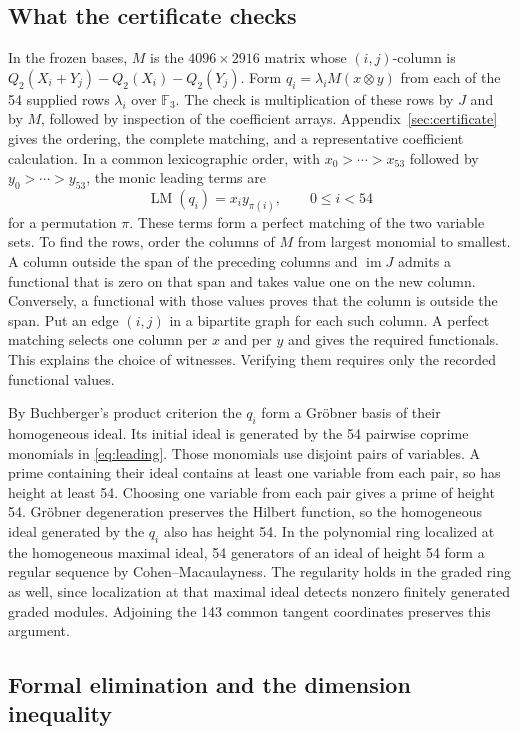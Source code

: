 \documentclass[11pt]{amsart}
\newcommand{\F}{\mathbb F}
\newcommand{\im}{\operatorname{im}}
\begin{document}
\subsection{What the certificate checks}
In the frozen bases, $M$ is the $4096\times2916$ matrix whose
$(i,j)$-column is
$Q_2(X_i+Y_j)-Q_2(X_i)-Q_2(Y_j)$.
Form $q_i=\lambda_iM(x\otimes y)$ from each of the 54 supplied rows
$\lambda_i$ over $\F_3$. The check is multiplication of these
rows by $J$ and by $M$, followed by inspection of the coefficient
arrays. Appendix~\ref{sec:certificate} gives the ordering, the
complete matching, and a representative coefficient calculation.
In a common lexicographic order, with $x_0>\cdots>x_{53}$ followed
by $y_0>\cdots>y_{53}$, the monic leading terms are
\begin{equation}\label{eq:leading}
  \operatorname{LM}(q_i)=x_i y_{\pi(i)},\qquad 0\le i<54
\end{equation}
for a permutation $\pi$. These terms form a perfect matching of the
two variable sets. To find the rows, order the columns of $M$ from
largest monomial to smallest. A column outside the span of the
preceding columns and $\im J$ admits a functional that is zero on
that span and takes value one on the new column. Conversely, a
functional with those values proves that the column is outside the
span. Put an edge $(i,j)$ in a bipartite graph for each such column.
A perfect matching selects one column per $x$ and per $y$ and
gives the required functionals. This explains the choice of
witnesses. Verifying them requires only the recorded functional values.

By Buchberger's product criterion the $q_i$ form a Gr\"obner
basis of their homogeneous ideal. Its initial ideal is generated
by the 54 pairwise coprime monomials in \eqref{eq:leading}. Those
monomials use disjoint pairs of variables. A prime containing their
ideal contains at least one variable from each pair, so has height
at least 54. Choosing one variable from each pair gives a prime
of height 54. Gr\"obner degeneration preserves the Hilbert function,
so the homogeneous ideal generated by the $q_i$ also has height 54.
In the polynomial ring localized at the homogeneous maximal ideal,
54 generators of an ideal of height 54 form a regular sequence
by Cohen--Macaulayness. The regularity holds in the graded ring
as well, since localization at that maximal ideal detects
nonzero finitely generated graded modules. Adjoining the 143 common
tangent coordinates preserves this argument.

\subsection{Formal elimination and the dimension inequality}
\end{document}

